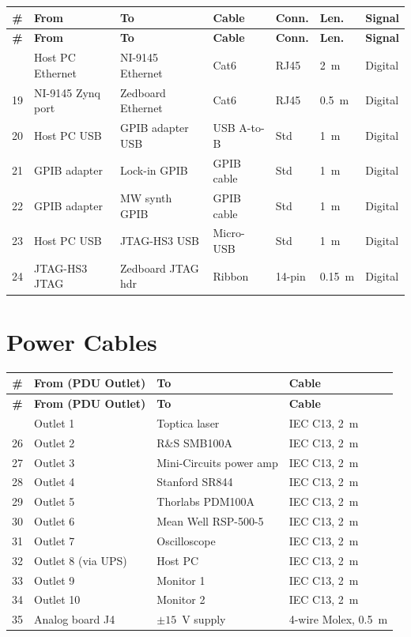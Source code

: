 \documentclass[11pt,a4paper,openany]{book}
\begin{document}
\begin{center}
\small
\begin{longtable}{clp{2cm}p{2cm}lll}
\toprule
\textbf{\#} & \textbf{From} & \textbf{To} & \textbf{Cable} & \textbf{Conn.} & \textbf{Len.} & \textbf{Signal} \\
\midrule
\endfirsthead
\toprule
\textbf{\#} & \textbf{From} & \textbf{To} & \textbf{Cable} & \textbf{Conn.} & \textbf{Len.} & \textbf{Signal} \\
\midrule
\endhead
\bottomrule
\endfoot
\bottomrule
\endlastfoot
18 & Host PC Ethernet & NI-9145 Ethernet & Cat6 & RJ45 & 2~m & Digital \\
19 & NI-9145 Zynq port & Zedboard Ethernet & Cat6 & RJ45 & 0.5~m & Digital \\
20 & Host PC USB & GPIB adapter USB & USB A-to-B & Std & 1~m & Digital \\
21 & GPIB adapter & Lock-in GPIB & GPIB cable & Std & 1~m & Digital \\
22 & GPIB adapter & MW synth GPIB & GPIB cable & Std & 1~m & Digital \\
23 & Host PC USB & JTAG-HS3 USB & Micro-USB & Std & 1~m & Digital \\
24 & JTAG-HS3 JTAG & Zedboard JTAG hdr & Ribbon & 14-pin & 0.15~m & Digital \\
\end{longtable}
\end{center}

\section{Power Cables}

\begin{center}
\small
\begin{longtable}{clll}
\toprule
\textbf{\#} & \textbf{From (PDU Outlet)} & \textbf{To} & \textbf{Cable} \\
\midrule
\endfirsthead
\toprule
\textbf{\#} & \textbf{From (PDU Outlet)} & \textbf{To} & \textbf{Cable} \\
\midrule
\endhead
\bottomrule
\endfoot
\bottomrule
\endlastfoot
25 & Outlet 1 & Toptica laser & IEC C13, 2~m \\
26 & Outlet 2 & R\&S SMB100A & IEC C13, 2~m \\
27 & Outlet 3 & Mini-Circuits power amp & IEC C13, 2~m \\
28 & Outlet 4 & Stanford SR844 & IEC C13, 2~m \\
29 & Outlet 5 & Thorlabs PDM100A & IEC C13, 2~m \\
30 & Outlet 6 & Mean Well RSP-500-5 & IEC C13, 2~m \\
31 & Outlet 7 & Oscilloscope & IEC C13, 2~m \\
32 & Outlet 8 (via UPS) & Host PC & IEC C13, 2~m \\
33 & Outlet 9 & Monitor 1 & IEC C13, 2~m \\
34 & Outlet 10 & Monitor 2 & IEC C13, 2~m \\
35 & Analog board J4 & $\pm 15$~V supply & 4-wire Molex, 0.5~m \\
\end{longtable}
\end{center}
\end{document}

